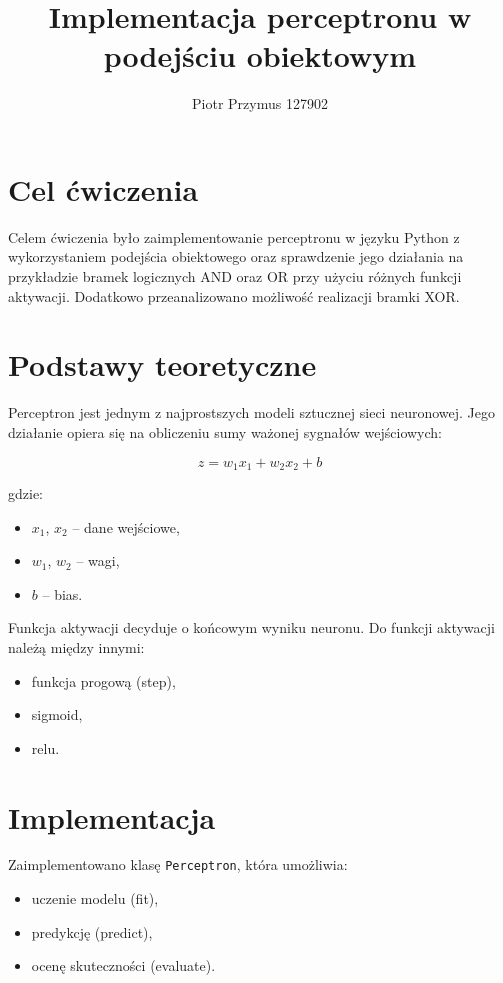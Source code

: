 \documentclass[a4paper,12pt]{article}
\title{Implementacja perceptronu w podejściu obiektowym}
\author{Piotr Przymus 127902}
\date{}
\begin{document}
\maketitle

\section{Cel ćwiczenia}

Celem ćwiczenia było zaimplementowanie perceptronu w języku Python z wykorzystaniem podejścia obiektowego oraz sprawdzenie jego działania na przykładzie bramek logicznych AND oraz OR przy użyciu różnych funkcji aktywacji. Dodatkowo przeanalizowano możliwość realizacji bramki XOR.

\section{Podstawy teoretyczne}

Perceptron jest jednym z najprostszych modeli sztucznej sieci neuronowej. Jego działanie opiera się na obliczeniu sumy ważonej sygnałów wejściowych:

\[
z = w_1 x_1 + w_2 x_2 + b
\]

gdzie:
\begin{itemize}
\item $x_1$, $x_2$ -- dane wejściowe,
\item $w_1$, $w_2$ -- wagi,
\item $b$ -- bias.
\end{itemize}

Funkcja aktywacji decyduje o końcowym wyniku neuronu. Do funkcji aktywacji należą między innymi:
\begin{itemize}
\item funkcja progową (step),
\item sigmoid,
\item relu.
\end{itemize}

\section{Implementacja}

Zaimplementowano klasę \texttt{Perceptron}, która umożliwia:
\begin{itemize}
\item uczenie modelu (fit),
\item predykcję (predict),
\item ocenę skuteczności (evaluate).
\end{itemize}
\end{document}
